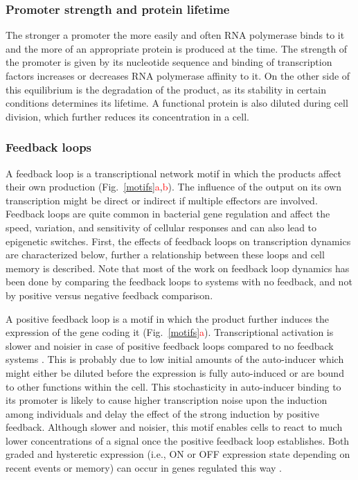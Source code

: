 \subsubsection{Promoter strength and protein lifetime}
The stronger a promoter the more easily and often RNA polymerase binds to it and the more of an appropriate protein is produced at the time.
The strength of the promoter is given by its nucleotide sequence and binding of transcription factors increases or decreases RNA polymerase affinity to it.
On the other side of this equilibrium is the degradation of the product, as its stability in certain conditions determines its lifetime.
A functional protein is also diluted during cell division, which further reduces its concentration in a cell.

\subsubsection{Feedback loops}
A feedback loop is a transcriptional network motif in which the products affect their own production (Fig.~\ref{motifs}\textcolor{red}{a},\textcolor{red}{b}).
The influence of the output on its own transcription might be direct or indirect if multiple effectors are involved.
Feedback loops are quite common in bacterial gene regulation and affect the speed, variation, and sensitivity of cellular responses and can also lead to epigenetic switches.
First, the effects of feedback loops on transcription dynamics are characterized below, further a relationship between these loops and cell memory is described.
Note that most of the work on feedback loop dynamics has been done by comparing the feedback loops to systems with no feedback, and not by positive versus negative feedback comparison.

A positive feedback loop is a motif in which the product further induces the expression of the gene coding it (Fig.~\ref{motifs}\textcolor{red}{a}).
Transcriptional activation is slower and noisier in case of positive feedback loops compared to no feedback systems \cite{maeda2006regulatory, sayut2007noise}.
This is probably due to low initial amounts of the auto-inducer which might either be diluted before the expression is fully auto-induced or are bound to other functions within the cell.
This stochasticity in auto-inducer binding to its promoter is likely to cause higher transcription noise upon the induction among individuals and delay the effect of the strong induction by positive feedback.
Although slower and noisier, this motif enables cells to react to much lower concentrations of a signal once the positive feedback loop establishes.
Both graded and hysteretic expression (i.e., ON or OFF expression state depending on recent events or memory) can occur in genes regulated this way \cite{maeda2006regulatory}.

